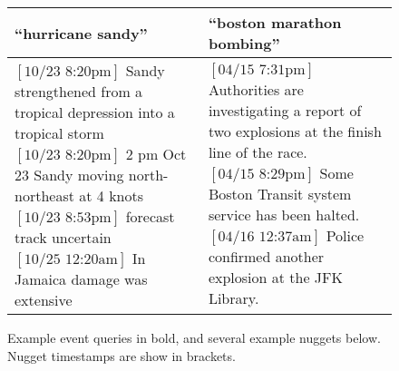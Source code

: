 \begin{figure}
    \begin{tabular}{p{7.5cm}|p{7.5cm}}
         \textbf{``hurricane sandy''} &\textbf{``boston marathon bombing''} \\
        \hline
        \parbox{7.4cm}{\small
    $[\textrm{10/23 8:20pm}]$ Sandy strengthened from a tropical depression 
    into a tropical storm \\
    $[\textrm{10/23 8:20pm}]$ 2 pm Oct 23 Sandy moving north-northeast at 4 
    knots \\
    $[\textrm{10/23 8:53pm}]$ forecast track uncertain \\
    $[\textrm{10/25 12:20am}]$ In Jamaica damage was extensive
} & \parbox{7.4cm}{ \small
    $[\textrm{04/15 7:31pm}]$ Authorities are investigating a report of two 
    explosions at the finish line of the race. \\
    $[\textrm{04/15 8:29pm}]$ Some Boston Transit system service has been 
    halted.\\
    $[\textrm{04/16 12:37am}]$ Police confirmed another explosion at the JFK
    Library.
}
\end{tabular}
    \caption{Example event queries in bold, and several example nuggets below.
    Nugget timestamps are show in brackets.}
    \label{fig:eventsnuggets}
\end{figure}


